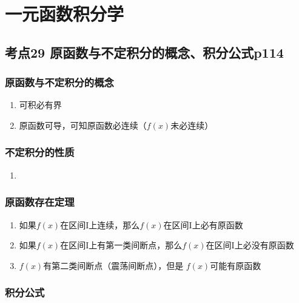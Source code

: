 \chapter{一元函数积分学}

\section{考点29 原函数与不定积分的概念、积分公式p114}

\subsection{原函数与不定积分的概念}

\begin{enumerate}
    \item 可积必有界
    \item 原函数可导，可知原函数必连续（$f(x)$未必连续）
\end{enumerate}

\subsection{不定积分的性质}

\begin{enumerate}
    \item 
\end{enumerate}

\subsection{原函数存在定理}

\begin{enumerate}
    \item 如果$f(x)$在区间I上连续，那么$f(x)$在区间I上必有原函数
    \item 如果$f(x)$在区间I上有第一类间断点，那么$f(x)$在区间I上必没有原函数
    \item $f(x)$有第二类间断点（震荡间断点），但是 $f(x)$可能有原函数
\end{enumerate}

\subsection{积分公式}

